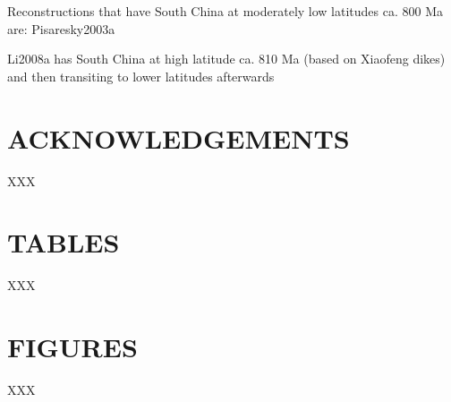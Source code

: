 \documentclass[11pt,letterpaper]{article}
\begin{document}
Reconstructions that have South China at moderately low latitudes ca. 800 Ma are: Pisaresky2003a

Li2008a has South China at high latitude ca. 810 Ma (based on Xiaofeng dikes) and then transiting to lower latitudes afterwards

\section*{ACKNOWLEDGEMENTS \label{sec:ACKNOWLEDGEMENTS}}

XXX

\clearpage
\newpage

\section*{TABLES}

XXX

\clearpage
\newpage

\section*{FIGURES}

XXX

\clearpage
\newpage
\footnotesize

\singlespacing



\end{document}
